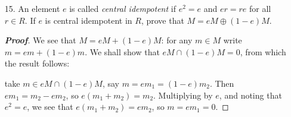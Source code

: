 \documentclass[12pt,leqno]{book}
\theoremstyle{definition}
\newcommand{\Z}{\mathbb{Z}}
\newcommand{\Q}{\mathbb{Q}}
\newenvironment{Proof}{\begin{proof}[\textnormal{\textbf{Proof}}]}{\end{proof}}
\begin{document}
\begin{enumerate}
\begin{Proof}
 By the previous problem, $\Q/\Z$ is a torsion module. Moreover, its annihilator must send $\frac{a}{b}$ to an element in $\Z$. The only such element which works for all element of $\Q/\Z$ is 0, so its annihilator is the zero ideal. 
\end{Proof}

 \item [15.] An element $e$ is called \textit{central idempotent} if $e^2=e$ and $er=re$ for all $r\in R$. If $e$ is central idempotent in $R$, prove that $M=eM\oplus(1-e)M$.

\begin{Proof}
 We see that $M=eM+(1-e)M$: for any $m\in M$ write $m=em+(1-e)m$. We shall show that $eM\cap(1-e)M=0$, from which the result follows: 

take $m\in eM\cap(1-e)M$, say $m=em_1=(1-e)m_2$. Then $em_1=m_2-em_2$, so $e(m_1+m_2)=m_2$. Multiplying by $e$, and noting that $e^2=e$, we see that $e(m_1+m_2)=em_2$, so $m=em_1=0$. 
\end{Proof}

\end{enumerate}
\end{document}
